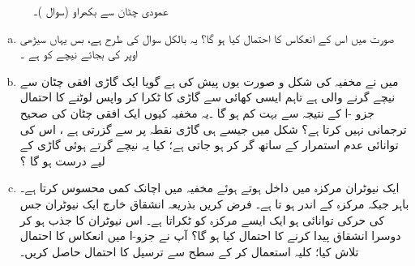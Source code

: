\begin{figure}
\centering
{}
\caption{عمودی چٹان سے بکھراو (سوال )۔}
\label{شکل_غیر_تابع_شروڈنگر_عمودی_چٹان_بکھراو}
\end{figure}
%
\begin{enumerate}[a.]
\item
 صورت  میں اس کے انعکاس کا احتمال کیا ہو گا؟  یہ بالکل سوال  کی طرح ہے، بس یہاں سیڑھی اوپر کی بجائے نیچے کو ہے ۔
\item 
 میں نے مخفیہ کی شکل و صورت یوں پیش کی ہے گویا ایک گاڑی افقی چٹان سے نیچے گرنے والی ہے تاہم ایسی کھائی سے گاڑی کا ٹکرا کر واپس لوٹنے کا احتمال جزو -ا کے نتیجہ سے بہت کم ہو گا ۔یہ مخفیہ کیوں ایک افقی چٹان کی صحیح ترجمانی نہیں کرتا ہے؟  شکل  میں جیسے ہی گاڑی نقطہ  پر سے گزرتی ہے ، اس کی توانائی عدم استمرار کے ساتھ گر کر ہو جاتی ہے؛ کیا یہ نیچے گرتے ہوئی گاڑی کے لیے درست ہو گا ؟
\item
ایک نیوٹران مرکزہ میں داخل ہوتے ہوئے مخفیہ میں اچانک کمی محسوس کرتا ہے۔ باہر  جبکہ مرکزہ کے اندر  ہو تا ہے۔ فرض کریں بذریعہ انشقاق خارج ایک نیوٹران جس کی حرکی توانائی  ہو ایک ایسے مرکزہ کو ٹکراتا ہے۔ اس نیوٹران کا جذب ہو کر دوسرا انشقاق پیدا کرنے کا احتمال کیا ہو گا؟  آپ نے جزو-ا میں انعکاس کا احتمال تلاش کیا؛ کلیہ  استعمال کر کے سطح سے ترسیل کا احتمال حاصل کریں۔
\end{enumerate}

